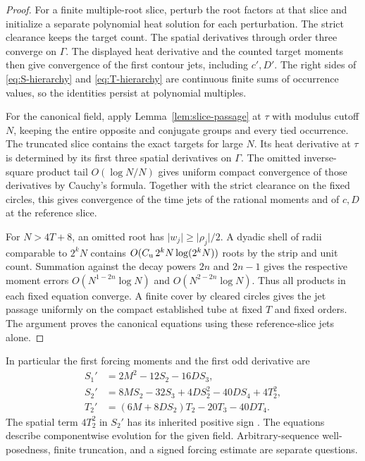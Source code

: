 \begin{proof}
For a finite multiple-root slice, perturb the root factors at that
slice and initialize a separate polynomial heat solution for each
perturbation. The strict clearance keeps the target count. The
spatial derivatives through order three converge on \(\Gamma\).
The displayed heat derivative and the counted target moments then
give convergence of the first contour jets, including \(c',D'\).
The right sides of \eqref{eq:S-hierarchy} and \eqref{eq:T-hierarchy}
are continuous finite sums of occurrence values, so the identities
persist at polynomial multiples.

For the canonical field, apply Lemma~\ref{lem:slice-passage} at
\(\tau\) with modulus cutoff \(N\), keeping the entire opposite and
conjugate groups and every tied occurrence. The truncated slice
contains the exact targets for large \(N\). Its heat derivative at
\(\tau\) is determined by its first three spatial derivatives on
\(\Gamma\). The omitted inverse-square product tail
\(O(\log N/N)\) gives uniform compact convergence of those
derivatives by Cauchy's formula. Together with the strict clearance
on the fixed circles, this gives convergence of the time jets of
the rational moments and of \(c,D\) at the reference slice.

For \(N>4T+8\), an omitted root has \(\lvert w_j\rvert\geq
\lvert\rho_j\rvert/2\). A dyadic shell of radii comparable to
\(2^kN\) contains \(O(C_{\mathrm u}\,2^kN\log(2^kN))\) roots by the strip
and unit count. Summation against the decay powers \(2n\) and
\(2n-1\) gives the respective moment errors
\(O(N^{1-2n}\log N)\) and \(O(N^{2-2n}\log N)\).
Thus all products in each fixed equation converge. A finite
cover by cleared circles gives the jet passage uniformly on the
compact established tube at fixed \(T\) and fixed orders. The argument
proves the canonical equations using these reference-slice jets alone.
\end{proof}

In particular the first forcing moments and the first odd derivative are
\begin{equation}
 \begin{aligned}
 S_1'&=2M^2-12S_2-16DS_3,\\
 S_2'&=8MS_2-32S_3+4DS_2^2-40DS_4+4T_2^2,\\
 T_2'&=(6M+8DS_2)T_2-20T_3-40DT_4 .
 \end{aligned}
 \label{eq:low-orders}
\end{equation}
The spatial term \(4T_2^2\) in \(S_2'\) has its inherited
positive sign \cite{BakerGR02,BakerGR05}. The equations describe
componentwise evolution for the given field. Arbitrary-sequence
well-posedness, finite truncation, and a signed forcing estimate
are separate questions.
